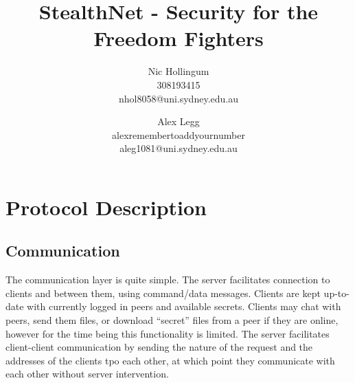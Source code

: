 
\author{
		Nic Hollingum\\
		308193415\\
		nhol8058@uni.sydney.edu.au
	\and
		Alex Legg\\
		alexremembertoaddyournumber\\
		aleg1081@uni.sydney.edu.au
}
\title{StealthNet - Security for the Freedom Fighters}

\addtolength{\oddsidemargin}{-.875in}
\addtolength{\evensidemargin}{-.875in}
\addtolength{\textwidth}{1.75in}
\addtolength{\topmargin}{-1.375in}
\setlength{\topskip}{0mm}
\addtolength{\textheight}{3.5in}
\setlength{\parskip}{0mm}
\setlength{\itemsep}{0mm}


\maketitle

\section {Protocol Description}
\subsection{Communication}
The communication layer is quite simple.  The server facilitates connection to clients and between them, using command/data messages.
Clients are kept up-to-date with currently logged in peers and available secrets.
Clients may chat with peers, send them files, or download ``secret'' files from a peer if they are online, however for the time being this functionality is limited.
The server facilitates client-client communication by sending the nature of the request and the addresses of the clients tpo each other, at which point they communicate with each other without server intervention.

